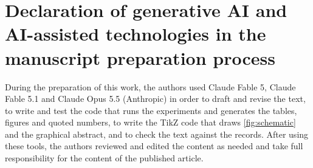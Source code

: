 \section*{Declaration of generative AI and AI-assisted technologies in the manuscript preparation process}

During the preparation of this work, the authors used Claude Fable 5, Claude Fable 5.1 and
Claude Opus 5.5 (Anthropic) in order to draft and revise the text, to write and test the
code that runs the experiments and generates the tables, figures and quoted numbers, to
write the TikZ code that draws \cref{fig:schematic} and the graphical abstract, and to check
the text against the records. After using these tools, the authors reviewed and
edited the content as needed and take full responsibility for the content of the published
article.
